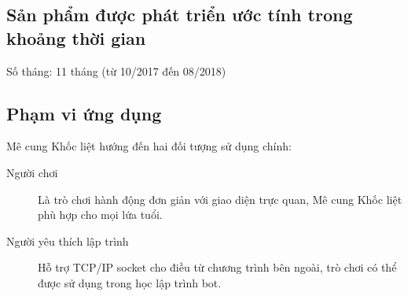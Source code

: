 \documentclass[a4paper,12pt]{article}
\begin{document}
\subsection{Sản phẩm được phát triển ước tính trong khoảng thời gian}
Số tháng: 11 tháng (từ 10/2017 đến 08/2018)

\subsection{Phạm vi ứng dụng}
Mê cung Khốc liệt hướng đến hai đối tượng sử dụng chính:

\begin{description}
  \item[Người chơi] Là trò chơi hành động đơn giản với giao diện trực quan, Mê
    cung Khốc liệt phù hợp cho mọi lứa tuổi.
  \item[Người yêu thích lập trình] Hỗ trợ TCP/IP socket cho điều từ chương
    trình bên ngoài, trò chơi có thể được sử dụng trong học lập trình bot.
\end{description}
\end{document}
